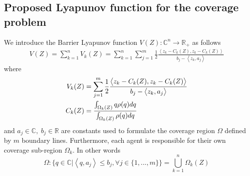 \documentclass[journal]{IEEEtran}
\newcommand*{\txtspc}[1]{#1\phantom{.}}%
\begin{document}
	\subsection{Proposed Lyapunov function for the coverage problem}
	We introduce the Barrier Lyapunov function $V(Z): \mathbb{C}^n \rightarrow \mathbb{R_+}$ as follows  
	\begin{equation}  \label{eqn:V}
	\begin{split}
	V(Z) = \sum^{n}_{k=1} V_k(Z) = \sum^{n}_{k=1} \sum^{m}_{j=1} \frac{1}{2} \frac{\left< z_k - C_k(Z), z_k - C_k(Z)\right>}{b_j - \left<z_k, a_j \right> }  
	\end{split}
	\end{equation}
	\noindent where
	\begin{equation} \notag
	\begin{split}
	V_k(Z) & = \sum^{m}_{j=1} \frac{1}{2} \frac{\left< z_k - C_k(Z), z_k - C_k(Z)\right>}{b_j - \left<z_k, a_j \right>} \\ %
	C_k(Z) & = \frac{\int_{\Omega_{k}(Z)}^{} q\rho(q)dq}{\int_{\Omega_{k}(Z)}^{} \rho(q)dq} \\ %
	\end{split}
	\end{equation}
	\noindent and
	$a_j \in \mathbb{C} \txtspc{,} b_j \in \mathbb{R}$ are constants used to formulate the coverage region $\Omega$ defined by $m$ boundary lines. Furthermore, each agent is responsible for their own coverage sub-region $\Omega_{k}$. In other words
	\[\Omega : \{q \in \mathbb{C}| \left <q,a_j \right > \leq b_j, \forall j \in \{1,...,m\}\} = \bigcup\limits_{k=1}^{n} \Omega_{k}(Z)\]
	
\end{document}
